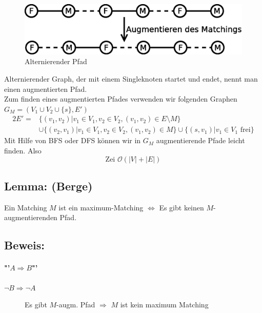 \begin{figure}
	\centering
	\includegraphics[width=\linewidth]{23/Grafik/Diagramm4}
	\caption{Alternierender Pfad}
	\label{fig:Diagramm4}
\end{figure}
Alternierender Graph, der mit einem Singleknoten startet und endet, nennt man einen augmentierten Pfad.\\


Zum finden eines augmentierten Pfades verwenden wir folgenden Graphen \\
$G_M = (V_1\cup V_2\cup \{ s \}, E')$
\begin{alignat*}{2} E'= &
\{ (v_1,v_2)|v_1\in V_1, v_2\in V_2, (v_1,v_2)\in E\setminus M \}\\
&\cup\{ (v_2,v_1)|v_1\in V_1, v_2\in V_2, (v_1,v_2)\in M \} \cup \{ (s,v_1)|v_1\in V_1 \text{ frei}\}
 \end{alignat*}
 Mit Hilfe von BFS oder DFS können wir in $G_M$ augmentierende Pfade leicht finden. Also
 \[ \text{Zei } \mathcal{O}(|V|+|E|)\]
 \subsection{Lemma: (Berge)}
 Ein Matching $M$ ist ein maximum-Matching $\Leftrightarrow$ Es gibt keinen $M$-augmentierenden Pfad.
 \subsection{Beweis:}
 \paragraph{"'$A\Rightarrow B$"'}
\begin{description}
 	\item[$\neg B \Rightarrow \neg A$] Es gibt $M$-augm. Pfad $\Rightarrow$ $M$ ist kein maximum Matching
 \end{description}
